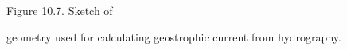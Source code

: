 \begin{figure}[h!]
\vspace{-2ex}
\centering
\footnotesize
Figure 10.7. Sketch of \rule{0mm}{3ex}geometry used for calculating
geostrophic current from hydrography.

\label{fig:hydrosketch}
\vspace{-2ex}
\end{figure}

